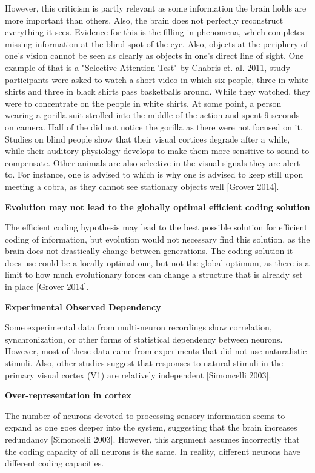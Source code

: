 \documentclass[twoside]{article}
\begin{document}
\begin{multicols}{2}
However, this criticism is partly relevant as some information the brain holds are more important than others. Also, the brain does not perfectly reconstruct everything it sees. Evidence for this is the filling-in phenomena, which completes missing information at the blind spot of the eye. Also, objects at the periphery of one's vision cannot be seen as clearly as objects in one's direct line of sight. One example of that is a "Selective Attention Test" by Chabris et. al. 2011, study participants were asked to watch a short video in which six people, three in white shirts and three in black shirts pass basketballs around. While they watched, they were to concentrate on the people in white shirts. At some point, a person wearing a  gorilla suit strolled into the middle of the action and spent 9 seconds on camera. Half of the did not notice the gorilla as there were not focused on it. Studies on blind people show that their visual cortices degrade after a while, while their auditory physiology develops to make them more sensitive to sound to compensate. Other animals are also selective in the visual signals they are alert to. For instance, one is advised to which is why one is advised to keep still upon meeting a cobra, as they cannot see stationary objects well [Grover 2014]. 

\noindent\textbf{Evolution may not lead to the globally optimal efficient coding solution}

The efficient coding hypothesis may lead to the best possible solution for efficient coding of information, but evolution would not necessary find this solution, as the brain does not drastically change between generations. The coding solution it does use could be a locally optimal one, but not the global optimum, as there is a limit to how much evolutionary forces can change a structure that is already set in place [Grover 2014]. 

\noindent\textbf{Experimental Observed Dependency}

Some experimental data from multi-neuron recordings show correlation, synchronization, or other forms of statistical dependency between neurons. However, most of these data came from experiments that did not use naturalistic stimuli. Also, other studies suggest that responses to natural stimuli in the primary visual cortex (V1) are relatively independent [Simoncelli 2003]. 

\noindent\textbf{Over-representation in cortex}

The number of neurons devoted to processing sensory information seems to expand as one goes deeper into the system, suggesting that the brain increases redundancy [Simoncelli 2003]. However, this argument assumes incorrectly that the coding capacity of all neurons is the same. In reality, different neurons have different coding capacities.


\end{multicols}
\end{document}
